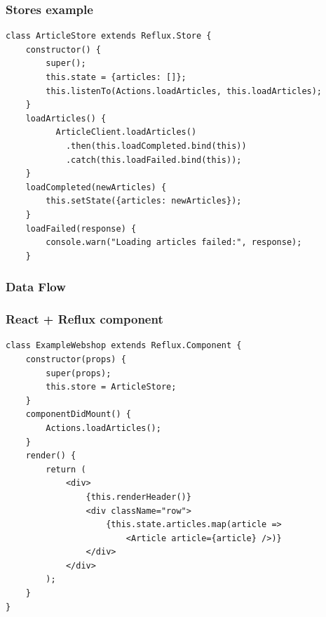 \documentclass{beamer}
\begin{document}
\begin{frame}[fragile]\frametitle{Stores example}
\begin{lstlisting}[style=htmlcssjs]
class ArticleStore extends Reflux.Store {
    constructor() {
        super();
        this.state = {articles: []};
        this.listenTo(Actions.loadArticles, this.loadArticles);
    }
    loadArticles() {
          ArticleClient.loadArticles()
            .then(this.loadCompleted.bind(this))
            .catch(this.loadFailed.bind(this));
    }
    loadCompleted(newArticles) {
        this.setState({articles: newArticles});
    }
    loadFailed(response) {
        console.warn("Loading articles failed:", response);
    }
\end{lstlisting}
\end{frame}

\begin{frame}\frametitle{Data Flow}
\centering
{}
\end{frame}

\begin{frame}[fragile]\frametitle{React + Reflux component}
\begin{lstlisting}[style=htmlcssjs]
class ExampleWebshop extends Reflux.Component {
    constructor(props) {
        super(props);
        this.store = ArticleStore;
    }
    componentDidMount() {
        Actions.loadArticles();
    }
    render() {
        return (
            <div>
                {this.renderHeader()}
                <div className="row">
                    {this.state.articles.map(article =>
                        <Article article={article} />)}
                </div>
            </div>
        );
    }
}
\end{lstlisting}
\end{frame}
\end{document}
